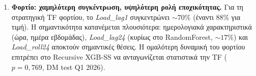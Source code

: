 \begin{enumerate}
\item \textbf{Φορτίο: χαμηλότερη συγκέντρωση, υψηλότερη ρολή εποχικότητας.}
Για τη στρατηγική TF φορτίου, το \textit{Load\_lag1} συγκεντρώνει ${\sim}70\%$
(έναντι $88\%$ για τιμή). Η σημαντικότητα κατανέμεται πλουσιότερα: ημερολογιακά
χαρακτηριστικά (ώρα, ημέρα εβδομάδας), \textit{Load\_lag24} (κυρίως στο
RandomForest, ${\sim}17\%$) και \textit{Load\_roll24} αποκτούν σημαντικές θέσεις. Η ομαλότερη δυναμική
του φορτίου επιτρέπει στο Recursive XGB-SS να ανταγωνίζεται στατιστικά την
TF ($p = 0{,}769$, DM test Q1 2026).

\end{enumerate}
